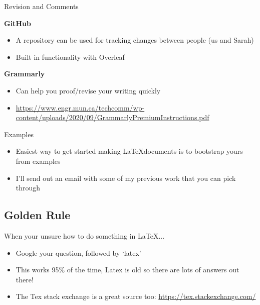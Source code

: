 \documentclass{beamer}
\begin{document}
\begin{frame}{Revision and Comments}

    \textbf{GitHub}
    \begin{itemize}
        \item A repository can be used for tracking changes between people (us and Sarah) 
        \item Built in functionality with Overleaf
    \end{itemize}
    
    \vspace{\baselineskip}
    
    \textbf{Grammarly}
    \begin{itemize}
        \item Can help you proof/revise your writing quickly
        \item \url{https://www.engr.mun.ca/techcomm/wp-content/uploads/2020/09/GrammarlyPremiumInstructions.pdf}
    \end{itemize}
    
\end{frame}

\begin{frame}{Examples}

    \begin{itemize}
        \item Easiest way to get started making \LaTeX documents is to bootstrap yours from examples
        \item I'll send out an email with some of my previous work that you can pick through
    \end{itemize}
    
\end{frame}

\subsection{Golden Rule}

\begin{frame}{When your unsure how to do something in \LaTeX... }
    
    \begin{itemize}
        \item Google your question, followed by `latex'
        \item This works 95\% of the time, Latex is old so there are lots of answers out there!
        \item The Tex stack exchange is a great source too: \url{https://tex.stackexchange.com/}
    \end{itemize}
    
\end{frame}
\end{document}
